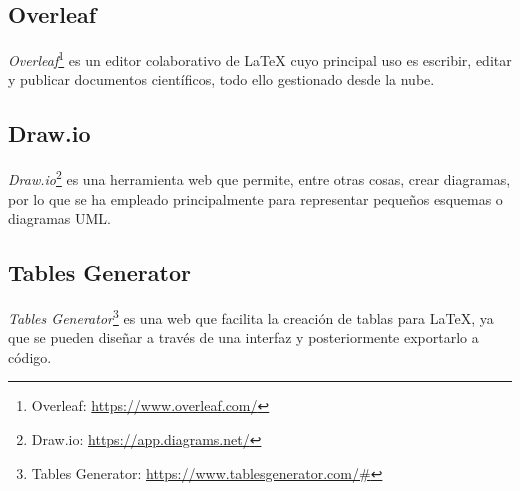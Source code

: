 \subsection{Overleaf}
\emph{Overleaf}\footnote{Overleaf: \url{https://www.overleaf.com/}} es un editor colaborativo de \LaTeX{} cuyo principal uso es escribir, editar y publicar documentos científicos, todo ello gestionado desde la nube.

\subsection{Draw.io}
\emph{Draw.io}\footnote{Draw.io: \url{https://app.diagrams.net/}} es una herramienta web que permite, entre otras cosas, crear diagramas, por lo que se ha empleado principalmente para representar pequeños esquemas o diagramas UML.

\subsection{Tables Generator}
\emph{Tables Generator}\footnote{Tables Generator: \url{https://www.tablesgenerator.com/\#}} es una web que facilita la creación de tablas para \LaTeX, ya que se pueden diseñar a través de una interfaz y posteriormente exportarlo a código.

